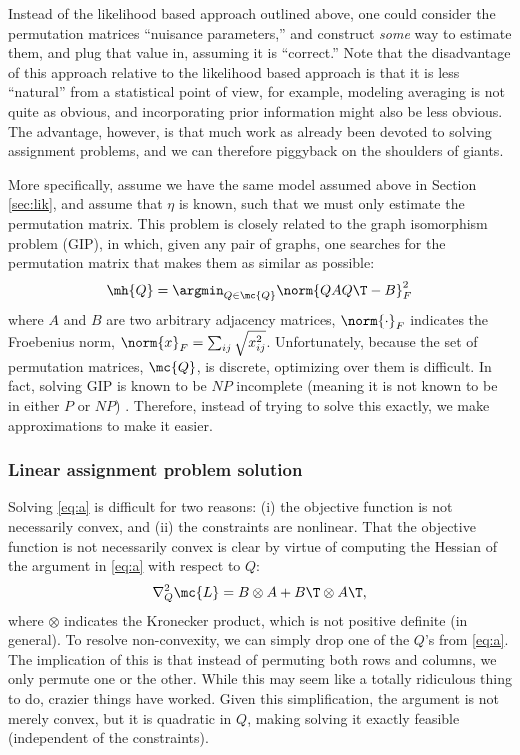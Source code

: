 Instead of the likelihood based approach outlined above, one could consider the permutation matrices ``nuisance parameters,'' and construct \emph{some} way to estimate them, and plug that value in, assuming it is ``correct.'' Note that the disadvantage of this approach relative to the likelihood based approach is that it is less ``natural'' from a statistical point of view, for example, modeling averaging is not quite as obvious, and incorporating prior information might also be less obvious.  The advantage, however, is that much work as already been devoted to solving assignment problems, and we can therefore piggyback on the shoulders of giants.  %

More specifically, assume we have the same model assumed above in Section \ref{sec:lik}, and assume that $\eta$ is known, such that we must only estimate the permutation matrix.  This problem is closely related to the graph isomorphism problem (GIP), in which, given any pair of graphs, one searches for the permutation matrix that makes them as similar as possible:
\begin{align} \label{eq:a}
	\mh{Q} = \argmin_{Q \in \mc{Q}} \norm{Q A Q\T - B}^2_F
\end{align}
where $A$ and $B$ are two arbitrary adjacency matrices, $\norm{\cdot}_{F}$ indicates the Froebenius norm, $\norm{x}_F=\sum_{ij} \sqrt{x_{ij}^2}$.  Unfortunately, because the set of permutation matrices, $\mc{Q}$, is discrete, optimizing over them is difficult.  In fact, solving GIP is known to be $NP$ incomplete (meaning it is not known to be in either $P$ or $NP$) \cite{??}.  Therefore, instead of trying to solve this exactly, we make approximations to make it easier.  

\subsubsection{Linear assignment problem solution} %
\label{ssub:linear_assignment_problem_solution}

Solving \eqref{eq:a} is difficult for two reasons: (i) the objective function is not necessarily convex, and (ii) the constraints are nonlinear.  That the objective function is not necessarily convex is clear by virtue of computing the Hessian of the argument in \eqref{eq:a} with respect to $Q$:
\begin{align}
	\nabla_Q^2 \mc{L} =  B \otimes A + B\T \otimes A\T,
\end{align}
where $\otimes$ indicates the Kronecker product, which is not positive definite (in general).  To resolve non-convexity, we can simply drop one of the $Q$'s from \eqref{eq:a}.  The implication of this is that instead of permuting both rows and columns, we only permute one or the other.  While this may seem like a totally ridiculous thing to do, crazier things have worked.  Given this simplification, the argument is not merely convex, but it is quadratic in $Q$, making solving it exactly feasible (independent of the constraints).  

